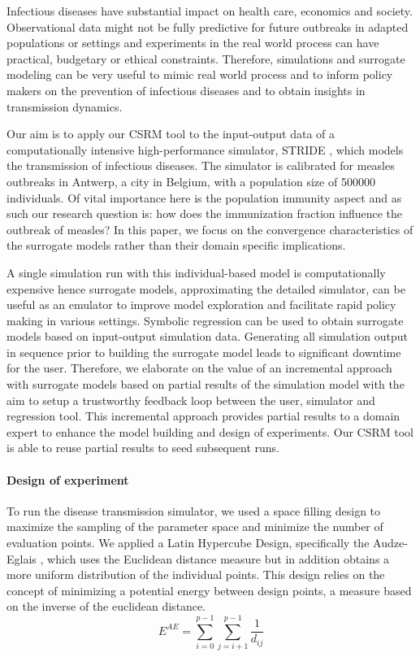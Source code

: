 
Infectious diseases have substantial impact on health care, economics and society. 
Observational data might not be fully predictive for future outbreaks in adapted populations or settings and experiments in the real world process can have practical, budgetary or ethical constraints. Therefore, simulations and surrogate modeling can be very useful to mimic real world process and to inform policy makers on the prevention of infectious diseases and to obtain insights in transmission dynamics.

Our aim is to apply our CSRM tool to the input-output data of a computationally intensive high-performance simulator, STRIDE \citep{stride}, which models the transmission of infectious diseases.
The simulator is calibrated for measles outbreaks in Antwerp, a city in Belgium, with a population size of 500000 individuals. Of vital importance here is the population immunity aspect and as such our research question is: how does the immunization fraction influence the outbreak of measles?
In this paper, we focus on the convergence characteristics of the surrogate models rather than their domain specific implications. 

A single simulation run with this individual-based model is computationally expensive hence surrogate models, approximating the detailed simulator, can be useful as an emulator to improve model exploration and facilitate rapid policy making in various settings. 
Symbolic regression can be used to obtain surrogate models based on input-output simulation data. Generating all simulation output in sequence prior to building the surrogate model leads to significant downtime for the user. 
Therefore, we elaborate on the value of an incremental approach with surrogate models based on partial results of the simulation model with the aim to setup a trustworthy feedback loop between the user, simulator and regression tool. 
This incremental approach provides partial results to a domain expert to enhance the model building and design of experiments. Our CSRM tool is able to reuse partial results to seed subsequent runs. %

\paragraph{Design of experiment}
To run the disease transmission simulator, we used a space filling design to maximize the sampling of the parameter space and minimize the number of evaluation points. We applied a Latin Hypercube Design, specifically the Audze-Eglais \citep{AudzeEglais, AudzeEglais2, AudzeEglais3}, which uses the Euclidean distance measure but in addition obtains a more uniform distribution of the individual points. This design relies on the concept of minimizing a potential energy between design points, a measure based on the inverse of the euclidean distance.
\[
E^{AE} = \sum_{i=0}^{p-1} {\sum_{j=i+1}^{p-1} {\frac{1}{d_{ij}}}}
\]

